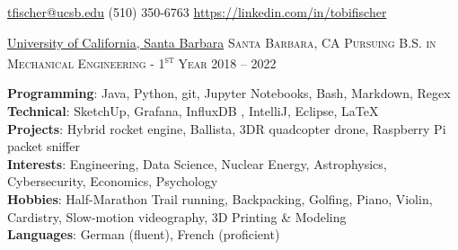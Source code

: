 \documentclass[11pt]{article}
\begin{document}
\sloppy  %




\nobreakvspace{0.3em}  %



\noindent\href{mailto:tfischer@ucsb.edu}{tfischer@ucsb.edu}\sbull
(510) 350-6763 \sbull
\href{https://linkedin.com/in/tobifischer}{https://linkedin.com/in/tobifischer}\hfill
{}


\spacedhrule{0.2em}{-0.6em}  %


\headedsection
{\href{https://engineering.ucsb.edu/}{University of California, Santa Barbara}}
{\textsc{Santa Barbara, CA}} {%
	\headedsubsection
	{\textsc{Pursuing B.S. in Mechanical Engineering - {\large 1}\textsuperscript{st} Year}}
	{2018 -- 2022}{}
}
\spacedhrule{0em}{-0.6em}


	\textbf{Programming}: Java, Python, git, Jupyter Notebooks, Bash, Markdown, Regex \\
	\textbf{Technical}: SketchUp, Grafana, InfluxDB , IntelliJ, Eclipse, \LaTeX\\
	\textbf{Projects}: Hybrid rocket engine, Ballista, 3DR quadcopter drone, Raspberry Pi packet sniffer\\
	\textbf{Interests}: Engineering, Data Science, Nuclear Energy, Astrophysics, Cybersecurity, Economics, Psychology \\
	\textbf{Hobbies}: Half-Marathon Trail running, Backpacking, Golfing, Piano, Violin, Cardistry, Slow-motion videography, 3D Printing \& Modeling\\
	\textbf{Languages}: German (fluent), French (proficient)
\end{document}
